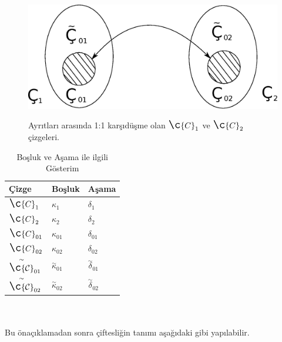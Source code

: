 \documentclass[11pt]{amsbook}
\begin{document}
	
	\bigskip
	\begin{figure}[h]
		\centering
		\includegraphics[width=.8\linewidth]{images/ceyhun-207-4-3-1.eps}
		\label{fig:4.3.1}
		\bigskip
		\caption{Ayrıtları arasında 1:1 karşıdüşme olan $\Large\c{C}_1$ ve $\Large\c{C}_2$ çizgeleri.}
	\end{figure}
	\setlength{\arrayrulewidth}{1mm}
	\setlength{\tabcolsep}{18pt}
	\renewcommand{\arraystretch}{2}
	\begin{table}[h]
		\centering
		\caption{Boşluk ve Aşama ile ilgili Gösterim}
		\label{tab:4.3.1}
		\begin{tabular}{ |p{3cm}|p{3cm}|p{3cm}|  }
			\hline
			Çizge & Boşluk & Aşama \\ \hline
			$\Large\c{C}_1$     &\huge$\kappa$\Large$_1$        &\Large$\delta_1$       \\
			$\Large\c{C}_2$     &\huge$\kappa$\Large$_2$        &\Large$\delta_2$       \\
			$\Large\c{C}_{01}$     &\huge${\kappa}$\Large$_{01}$        &\Large$\delta_{01}$       \\
			$\Large\c{C}_{02}$     &\huge${\kappa}$\Large$_{02}$         &\Large$\delta_{02}$       \\
			$\overset{\sim}{\mathcal{\Large\c{C}}}_{01}$    &\huge$\overset{\sim}{\mathcal{\kappa}}$\Large$_{01}$        &\Large$\overset{\sim}{\mathcal{\delta}}$\Large$_{01}$       \\
			$\overset{\sim}{\mathcal{\Large\c{C}}}_{02}$      &\huge$\overset{\sim}{\mathcal{\kappa}}$\Large$_{02}$      &\Large$\overset{\sim}{\mathcal{\delta}}$\Large$_{02}$    \\
			\hline
		\end{tabular}
	\end{table}
	\\\\
	Bu önaçıklamadan sonra çiftesliğin tanımı aşağıdaki
	gibi yapılabilir. 
\end{document}
